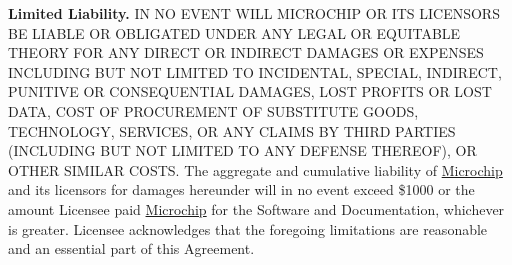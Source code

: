 \begin{DoxyEnumerate}
\item {\bfseries Limited Liability.} I\+N N\+O E\+V\+E\+N\+T W\+I\+L\+L M\+I\+C\+R\+O\+C\+H\+I\+P O\+R I\+T\+S L\+I\+C\+E\+N\+S\+O\+R\+S B\+E L\+I\+A\+B\+L\+E O\+R O\+B\+L\+I\+G\+A\+T\+E\+D U\+N\+D\+E\+R A\+N\+Y L\+E\+G\+A\+L O\+R E\+Q\+U\+I\+T\+A\+B\+L\+E T\+H\+E\+O\+R\+Y F\+O\+R A\+N\+Y D\+I\+R\+E\+C\+T O\+R I\+N\+D\+I\+R\+E\+C\+T D\+A\+M\+A\+G\+E\+S O\+R E\+X\+P\+E\+N\+S\+E\+S I\+N\+C\+L\+U\+D\+I\+N\+G B\+U\+T N\+O\+T L\+I\+M\+I\+T\+E\+D T\+O I\+N\+C\+I\+D\+E\+N\+T\+A\+L, S\+P\+E\+C\+I\+A\+L, I\+N\+D\+I\+R\+E\+C\+T, P\+U\+N\+I\+T\+I\+V\+E O\+R C\+O\+N\+S\+E\+Q\+U\+E\+N\+T\+I\+A\+L D\+A\+M\+A\+G\+E\+S, L\+O\+S\+T P\+R\+O\+F\+I\+T\+S O\+R L\+O\+S\+T D\+A\+T\+A, C\+O\+S\+T O\+F P\+R\+O\+C\+U\+R\+E\+M\+E\+N\+T O\+F S\+U\+B\+S\+T\+I\+T\+U\+T\+E G\+O\+O\+D\+S, T\+E\+C\+H\+N\+O\+L\+O\+G\+Y, S\+E\+R\+V\+I\+C\+E\+S, O\+R A\+N\+Y C\+L\+A\+I\+M\+S B\+Y T\+H\+I\+R\+D P\+A\+R\+T\+I\+E\+S (I\+N\+C\+L\+U\+D\+I\+N\+G B\+U\+T N\+O\+T L\+I\+M\+I\+T\+E\+D T\+O A\+N\+Y D\+E\+F\+E\+N\+S\+E T\+H\+E\+R\+E\+O\+F), O\+R O\+T\+H\+E\+R S\+I\+M\+I\+L\+A\+R C\+O\+S\+T\+S. The aggregate and cumulative liability of \hyperlink{namespace_microchip}{Microchip} and its licensors for damages hereunder will in no event exceed \$1000 or the amount Licensee paid \hyperlink{namespace_microchip}{Microchip} for the Software and Documentation, whichever is greater. Licensee acknowledges that the foregoing limitations are reasonable and an essential part of this Agreement.



\end{DoxyEnumerate}
